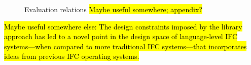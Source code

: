 
\begin{figure}[h!]
\small
{}
\caption{Evaluation relations \hl{ Maybe useful somewhere; appendix? } }
\end{figure}


\hl{
Maybe useful somewhere else:
The design constraints imposed by the library approach has led to a
novel point in the design space of language-level IFC systems---when
compared to more traditional IFC systems---that incorporates ideas
from previous IFC operating systems.
}
